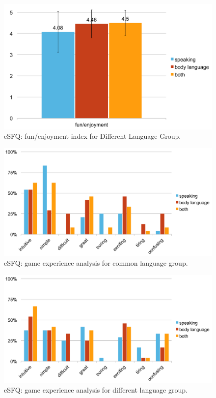 \begin{figure}[!h]
\centering
\includegraphics[width=0.9\columnwidth]{Figures/US_Fun_Dif.pdf}
\caption{eSFQ: fun/enjoyment index for Different Language Group.}
\label{fig:US_Fun_Dif}
\end{figure}

\begin{figure}[!h]
\centering
\includegraphics[width=0.9\columnwidth]{Figures/US_eSFQ_Com_Fun.pdf}
\caption{eSFQ: game experience analysis for common language group.}
\label{fig:US_eSFQ_Com_Fun}
\end{figure}

\begin{figure}[!h]
\centering
\includegraphics[width=0.9\columnwidth]{Figures/US_eSFQ_Dif_Fun.pdf}
\caption{eSFQ: game experience analysis for different language group.}
\label{fig:US_eSFQ_Dif_Fun}
\end{figure}



